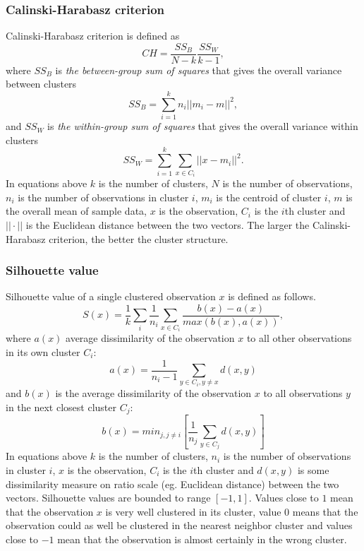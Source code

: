 \subsubsection{Calinski-Harabasz criterion}
Calinski-Harabasz criterion is defined as
\begin{equation}
 CH = \frac{SS_B}{N-k} \frac{SS_W}{k-1},
\end{equation}
where $SS_B$ is \emph{the between-group sum of squares} that gives
the overall variance between clusters
\begin{equation}
 SS_B = \sum_{i=1}^k n_i ||m_i-m||^2,
\end{equation}
and $SS_W$ is \emph{the within-group sum of squares} that gives 
the overall variance within clusters
\begin{equation}
 SS_W = \sum_{i=1}^k \sum_{x\in C_i} ||x-m_i||^2.
\end{equation}
In equations above $k$ is the number of clusters, $N$ is the 
number of observations, $n_i$ is the number of observations in 
cluster $i$, $m_i$ is the centroid of cluster $i$, $m$ is the 
overall mean of sample data, $x$ is the observation, $C_i$ is the 
$i$th cluster and $|| \cdot ||$ is the Euclidean 
distance between the two vectors. The larger the 
Calinski-Harabasz criterion, the better the cluster structure.

\subsubsection{Silhouette value}
Silhouette value of a single clustered observation $x$ is defined 
as follows.
\begin{equation}
 S(x) = \frac{1}{k}\sum_i \frac{1}{n_i}\sum_{x \in C_i}\frac{b(x) - a(x)}{max(b(x), a(x))},
\end{equation}
where $a(x)$ average dissimilarity of the observation $x$ to all 
other observations in its own cluster 
$C_i$:
\begin{equation}
  a(x) = \frac{1}{n_i - 1} \sum_{y \in C_i, y \neq x}d(x,y)  
\end{equation}
and $b(x)$ is the average dissimilarity of the observation $x$ to 
all observations $y$ in the next closest cluster $C_j$:
\begin{equation}
  b(x) = min_{j,j \neq i}[\frac{1}{n_j} \sum_{y \in C_j}d(x,y)]
\end{equation}
In equations above $k$ is the number of clusters, $n_i$ is the 
number of observations in cluster $i$, $x$ is the observation, 
$C_i$ is the $i$th cluster and $d(x,y)$ is some dissimilarity 
measure on ratio scale (eg. Euclidean distance) between the two 
vectors. Silhouette values are bounded to range $[-1,1]$. Values
close to $1$ mean that the observation $x$ is very well clustered 
in its cluster, value $0$ means that the observation could as well
be clustered in the nearest neighbor cluster and values close to 
$-1$ mean that the observation is almost certainly in the wrong 
cluster.

